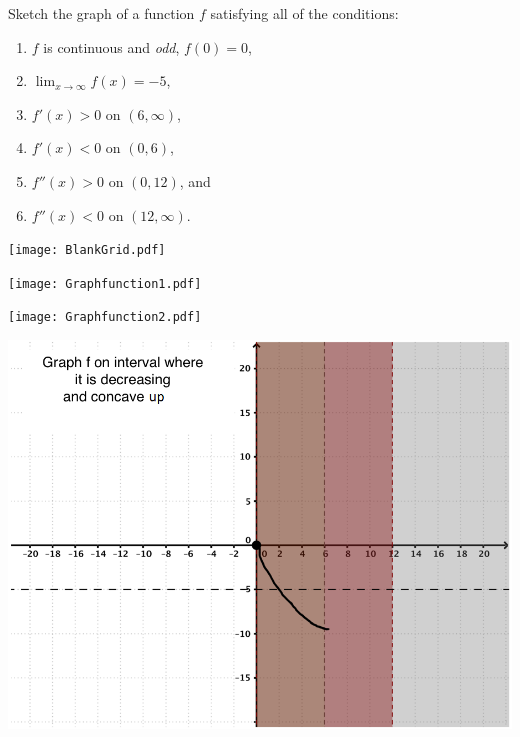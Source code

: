\documentclass[nooutcomes,handout]{ximera}
\begin{document}
\begin{problem}

  Sketch the graph of a function $f$ satisfying all of the conditions:
  \begin{enumerate}
    \item
      $f$ is continuous and \emph{odd}, $f(0) = 0$,

    \item
      $\displaystyle \lim_{x \to \infty} f(x) = -5$,

    \item
      $f'(x) > 0$ on $(6, \infty)$,

    \item
      $f'(x) < 0$ on $(0, 6)$,

    \item
      $f''(x) > 0$ on $(0, 12)$, and
      
    \item
      $f''(x) < 0$ on $(12, \infty)$.
  \end{enumerate}

    \begin{image}
      \texttt{[image: BlankGrid.pdf]}
    \end{image}

  \begin{freeResponse} \hfil
    \begin{image}
      \texttt{[image: Graphfunction1.pdf]}
    \end{image}
    \begin{image}
      \texttt{[image: Graphfunction2.pdf]}
    \end{image}

    \begin{image}
      \includegraphics[scale = 0.35]{Graphfunction4.png}
    \end{image}


\end{freeResponse}
\end{problem}
\end{document}
